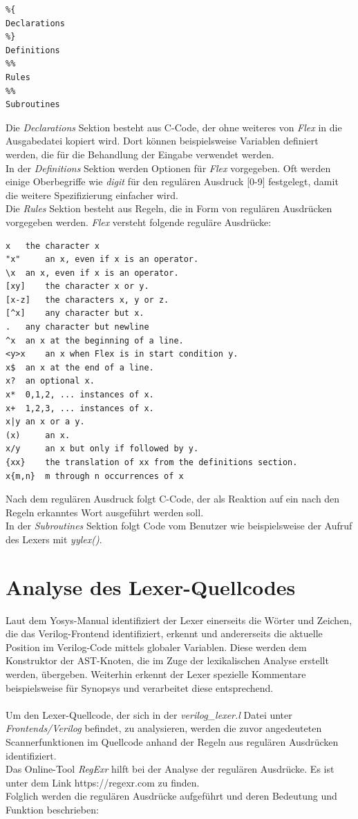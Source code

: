 \documentclass[11pt]{report}
\begin{document}
\begin{lstlisting}
%{ 
Declarations
%}
Definitions
%% 
Rules
%% 
Subroutines
\end{lstlisting}

Die \textit{Declarations} Sektion besteht aus C-Code, der ohne weiteres von \textit{Flex} in die Ausgabedatei kopiert wird. Dort können beispielsweise Variablen definiert werden, die für die Behandlung der Eingabe verwendet werden.\\

In der \textit{Definitions} Sektion werden Optionen für \textit{Flex} vorgegeben. Oft werden einige Oberbegriffe wie \textit{digit} für den regulären Ausdruck [0-9] festgelegt, damit die weitere Spezifizierung einfacher wird.\\

Die \textit{Rules} Sektion besteht aus Regeln, die in Form von regulären Ausdrücken vorgegeben werden. \textit{Flex} versteht folgende reguläre Ausdrücke:
\begin{lstlisting}
x 	the character x
"x" 	an x, even if x is an operator.
\x	an x, even if x is an operator.
[xy] 	the character x or y. 
[x-z] 	the characters x, y or z. 
[^x] 	any character but x.
.	any character but newline
^x 	an x at the beginning of a line. 
<y>x 	an x when Flex is in start condition y. 
x$ 	an x at the end of a line.
x? 	an optional x.
x* 	0,1,2, ... instances of x. 
x+ 	1,2,3, ... instances of x.
x|y	an x or a y.
(x) 	an x.
x/y 	an x but only if followed by y. 
{xx} 	the translation of xx from the definitions section. 
x{m,n} 	m through n occurrences of x 
\end{lstlisting}

Nach dem regulären Ausdruck folgt C-Code, der als Reaktion auf ein nach den Regeln erkanntes Wort ausgeführt werden soll.\\
In der \textit{Subroutines} Sektion folgt Code vom Benutzer wie beispielsweise der Aufruf des Lexers mit \textit{yylex()}. 

\section{Analyse des Lexer-Quellcodes}
Laut dem Yosys-Manual identifiziert der Lexer einerseits die Wörter und Zeichen, die das Verilog-Frontend identifiziert, erkennt und andererseits die aktuelle Position im Verilog-Code mittels globaler Variablen. Diese werden dem Konstruktor der AST-Knoten, die im Zuge der lexikalischen Analyse erstellt werden, übergeben. Weiterhin erkennt der Lexer spezielle Kommentare beispielsweise für Synopsys und verarbeitet diese entsprechend.\\
\\
Um den Lexer-Quellcode, der sich in der \textit{verilog\_lexer.l} Datei unter \textit{Frontends/Verilog} befindet, zu analysieren, werden die zuvor angedeuteten Scannerfunktionen im Quellcode anhand der Regeln aus regulären Ausdrücken identifiziert.
\\
Das Online-Tool \textit{RegExr} hilft bei der Analyse der regulären Ausdrücke. Es ist unter dem Link https://regexr.com zu finden.
\\
Folglich werden die regulären Ausdrücke aufgeführt und deren Bedeutung und Funktion beschrieben:
\end{document}
